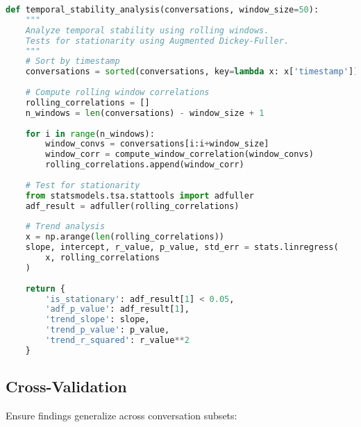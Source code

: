 \documentclass[11pt,letterpaper]{article}
\begin{document}
\begin{lstlisting}[language=Python]
def temporal_stability_analysis(conversations, window_size=50):
    """
    Analyze temporal stability using rolling windows.
    Tests for stationarity using Augmented Dickey-Fuller.
    """
    # Sort by timestamp
    conversations = sorted(conversations, key=lambda x: x['timestamp'])
    
    # Compute rolling window correlations
    rolling_correlations = []
    n_windows = len(conversations) - window_size + 1
    
    for i in range(n_windows):
        window_convs = conversations[i:i+window_size]
        window_corr = compute_window_correlation(window_convs)
        rolling_correlations.append(window_corr)
    
    # Test for stationarity
    from statsmodels.tsa.stattools import adfuller
    adf_result = adfuller(rolling_correlations)
    
    # Trend analysis
    x = np.arange(len(rolling_correlations))
    slope, intercept, r_value, p_value, std_err = stats.linregress(
        x, rolling_correlations
    )
    
    return {
        'is_stationary': adf_result[1] < 0.05,
        'adf_p_value': adf_result[1],
        'trend_slope': slope,
        'trend_p_value': p_value,
        'trend_r_squared': r_value**2
    }
\end{lstlisting}

\subsection{Cross-Validation}

Ensure findings generalize across conversation subsets:
\end{document}
